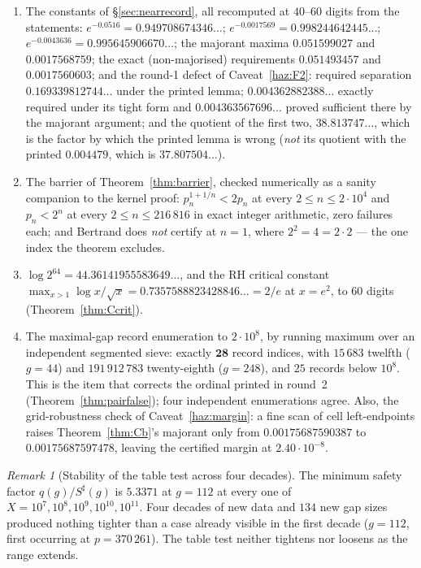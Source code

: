 \documentclass[11pt,a4paper]{article}
\theoremstyle{plain}
\theoremstyle{definition}
\theoremstyle{remark}
\newtheorem{remark}[theorem]{Remark}
\begin{document}
\begin{enumerate}
  $10^8$ is $220$, attained at $p = 47\,326\,693$; the largest below $6\,690\,557$ is $154$,
  attained at $p = 4\,652\,353$. Both by exact integer arithmetic over an in-run sieve.
\item[V11] The constants of \S\ref{sec:nearrecord}, all recomputed at $40$--$60$ digits from
  the statements: $e^{-0.0516} = 0.949708674346\ldots$;
  $e^{-0.0017569} = 0.998244642445\ldots$; $e^{-0.0043636} = 0.995645906670\ldots$;
  the majorant maxima $0.051599027$ and $0.0017568759$; the exact (non-majorised) requirements
  $0.051493457$ and $0.0017560603$; and the round-1 defect of Caveat~\ref{haz:F2}: required
  separation $0.169339812744\ldots$ under the printed lemma; $0.004362882388\ldots$ exactly
  required under its tight form and $0.004363567696\ldots$ proved sufficient there by the
  majorant argument; and the quotient of the first two, $38.813747\ldots$, which is the factor
  by which the printed lemma is wrong (\emph{not} its quotient with the printed $0.004479$,
  which is $37.807504\ldots$).
\item[V12] The barrier of Theorem~\ref{thm:barrier}, checked numerically as a sanity companion
  to the kernel proof: $p_n^{1+1/n} < 2p_n$ at every $2 \le n \le 2\cdot10^4$ and $p_n < 2^n$
  at every $2 \le n \le 216\,816$ in exact integer arithmetic, zero failures each; and Bertrand
  does \emph{not} certify at $n = 1$, where $2^2 = 4 = 2\cdot2$ --- the one index the theorem
  excludes.
\item[V13] $\log 2^{64} = 44.36141955583649\ldots$, and the RH critical constant
  $\max_{x>1}\log x/\sqrt{x} = 0.7357588823428846\ldots = 2/e$ at $x = e^2$, to 60 digits
  (Theorem~\ref{thm:Ccrit}).
\item[V14] The maximal-gap record enumeration to $2\cdot10^8$, by running maximum over an
  independent segmented sieve: exactly $\mathbf{28}$ record indices, with $15\,683$ twelfth
  ($g = 44$) and $191\,912\,783$ twenty-eighth ($g = 248$), and $25$ records below $10^8$.
  This is the item that corrects the ordinal printed in round~2
  (Theorem~\ref{thm:pairfalse}); four independent enumerations agree. Also, the grid-robustness
  check of Caveat~\ref{haz:margin}: a fine scan of cell left-endpoints raises
  Theorem~\ref{thm:Cb}'s majorant only from $0.00175687590387$ to $0.00175687597478$, leaving
  the certified margin at $2.40\cdot10^{-8}$.
\end{enumerate}

\begin{remark}[Stability of the table test across four decades]
The minimum safety factor $q(g)/S^\sharp(g)$ is $5.3371$ at $g = 112$ at every one of
$X = 10^7, 10^8, 10^9, 10^{10}, 10^{11}$. Four decades of new data and $134$ new gap sizes
produced nothing tighter than a case already visible in the first decade ($g = 112$, first
occurring at $p = 370\,261$). The table test neither tightens nor loosens as the range extends.
\end{remark}
\end{document}
